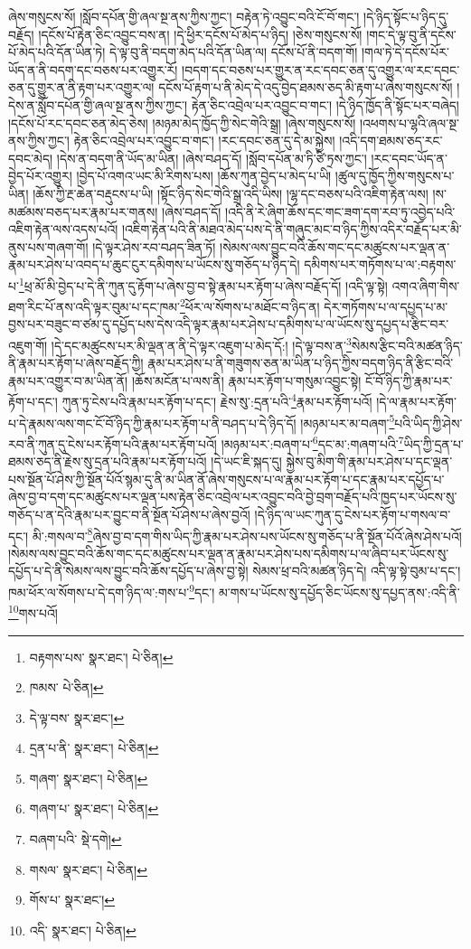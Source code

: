 ཞེས་གསུངས་སོ། །སློབ་དཔོན་གྱི་ཞལ་སྔ་ནས་ཀྱིས་ཀྱང་། བརྟེན་ཏེ་འབྱུང་བའི་ངོ་བོ་གང་། །དེ་ཉིད་སྟོང་པ་ཉིད་དུ་བརྗོད། །དངོས་པོ་རྟེན་ཅིང་འབྱུང་བས་ན། །དེ་ཕྱིར་དངོས་པོ་མེད་པ་ཉིད། །ཅེས་གསུངས་སོ། །གང་དེ་ལྟ་བུ་ནི་དངོས་པོ་མེད་པའི་དོན་ཡིན་ཏེ། དེ་ལྟ་བུ་ནི་བདག་མེད་པའི་དོན་ཡིན་ལ། དངོས་པོ་ནི་བདག་གོ། །གལ་ཏེ་དེ་དངོས་པོར་ཡོད་ན་ནི་བདག་དང་བཅས་པར་འགྱུར་རོ། །བདག་དང་བཅས་པར་གྱུར་ན་རང་དབང་ཅན་དུ་འགྱུར་ལ་རང་དབང་ཅན་དུ་གྱུར་ན་ནི་རྟག་པར་འགྱུར་ལ། དངོས་པོ་རྟག་པ་ནི་མེད་དེ་འདུ་བྱེད་ཐམས་ཅད་མི་རྟག་པ་ཞེས་གསུངས་སོ། །དེས་ན་སློབ་དཔོན་གྱི་ཞལ་སྔ་ནས་ཀྱིས་ཀྱང་། རྟེན་ཅིང་འབྲེལ་པར་འབྱུང་བ་གང་། །དེ་ཉིད་ཁྱོད་ནི་སྟོང་པར་བཞེད། །དངོས་པོ་རང་དབང་ཅན་མེད་ཅེས། །མཉམ་མེད་ཁྱོད་ཀྱི་སེང་གེའི་སྒྲ། །ཞེས་གསུངས་སོ། །འཕགས་པ་ལྷའི་ཞལ་སྔ་ནས་ཀྱིས་ཀྱང་། རྟེན་ཅིང་འབྲེལ་པར་འབྱུང་བ་གང་། །རང་དབང་ཅན་དུ་དེ་མ་སྐྱེས། །འདི་དག་ཐམས་ཅད་རང་དབང་མེད། །དེས་ན་བདག་ནི་ཡོད་མ་ཡིན། །ཞེས་བཤད་དོ། །སློབ་དཔོན་མ་ཏི་ཙི་ཏྲས་ཀྱང་། །རང་དབང་ཡོད་ན་བྱེད་པོར་འགྱུར། །བྱེད་པོ་འགའ་ཡང་མི་རིགས་པས། །ཆོས་ཀུན་བྱེད་པ་མེད་པ་ཡི། །ཚུལ་དུ་ཁྱོད་ཀྱིས་གསུངས་པ་ཡིན། །ཆོས་ཀྱི་རྔ་ཆེན་བརྡུངས་པ་ཡི། །སྟོང་ཉིད་སེང་གེའི་སྒྲ་འདི་ཡིས། །ལྷ་དང་བཅས་པའི་འཇིག་རྟེན་ལས། །ས་མཚམས་བཅད་པར་རྣམ་པར་གནས། །ཞེས་བཤད་དོ། །འདི་ནི་རེ་ཞིག་ཆོས་དང་གང་ཟག་དག་རབ་ཏུ་འབྱེད་པའི་འཇིག་རྟེན་ལས་འདས་པའོ། །འཇིག་རྟེན་པའི་ནི་མཐའ་མེད་པས་དེ་ནི་གཞུང་མང་བ་ཉིད་ཀྱིས་འདིར་བརྗོད་པར་མི་ནུས་པས་གཞག་གོ། །དེ་ལྟར་ཤེས་རབ་བཤད་ཟིན་ཏོ། །སེམས་ལས་བྱུང་བའི་ཆོས་གང་དང་མཚུངས་པར་ལྡན་ན་རྣམ་པར་ཤེས་པ་འབད་པ་ཆུང་ངུར་དམིགས་པ་ཡོངས་སུ་གཅོད་པ་ཉིད་དེ། དམིགས་པར་གཏོགས་པ་ལ་:བརྟགས་པ་\footnote{བརྟགས་པས་  སྣར་ཐང་།  པེ་ཅིན། }ཕྲ་མོ་མི་བྱེད་པ་དེ་ནི་ཀུན་དུ་རྟོག་པ་ཞེས་བྱ་བ་སྟེ་རྣམ་པར་རྟོག་པ་ཞེས་བརྗོད་དོ། །འདི་ལྟ་སྟེ། འགའ་ཞིག་གིས་ཐག་རིང་པོ་ནས་འདི་ལྟར་བུམ་པ་དང་ཁམ་\footnote{ཁམས་  པེ་ཅིན། }ཕོར་ལ་སོགས་པ་མཐོང་བ་ཉིད་ན། དེར་གཏོགས་པ་ལ་དཔྱད་པ་མ་བྱས་པར་བཟུང་བ་ཙམ་དུ་དཔྱོད་པས་དེས་འདི་ལྟར་རྣམ་པར་ཤེས་པ་དམིགས་པ་ལ་ཡོངས་སུ་དཔྱད་པ་རྩིང་བར་འཇུག་གོ། །དེ་དང་མཚུངས་པར་མི་ལྡན་ན་ནི་དེ་ལྟར་འཇུག་པ་མེད་དོ:། །དེ་ལྟ་བས་ན་\footnote{དེ་ལྟ་བས་  སྣར་ཐང་། }སེམས་རྩིང་བའི་མཚན་ཉིད་ནི་རྣམ་པར་རྟོག་པ་ཞེས་བརྗོད་ཀྱི། རྣམ་པར་ཤེས་པ་ནི་གཟུགས་ཅན་མ་ཡིན་པ་ཉིད་ཀྱིས་བདག་ཉིད་ནི་རྩིང་བའི་རྣམ་པར་འགྱུར་བ་མ་ཡིན་ནོ། །ཆོས་མངོན་པ་ལས་ནི། རྣམ་པར་རྟོག་པ་གསུམ་འབྱུང་སྟེ། ངོ་བོ་ཉིད་ཀྱི་རྣམ་པར་རྟོག་པ་དང་། ཀུན་ཏུ་ངེས་པའི་རྣམ་པར་རྟོག་པ་དང་། རྗེས་སུ་:དྲན་པའི་\footnote{དྲན་པ་ནི་  སྣར་ཐང་།  པེ་ཅིན། }རྣམ་པར་རྟོག་པའོ། །དེ་ལ་རྣམ་པར་རྟོག་པ་དེ་རྣམས་ལས་གང་ངོ་བོ་ཉིད་ཀྱི་རྣམ་པར་རྟོག་པ་ནི་བཤད་པ་དེ་ཉིད་དོ། །མཉམ་པར་མ་བཞག་\footnote{གཞག་  སྣར་ཐང་།  པེ་ཅིན། }པའི་ཡིད་ཀྱི་ཤེས་རབ་ནི་ཀུན་དུ་ངེས་པར་རྟོག་པའི་རྣམ་པར་རྟོག་པའོ། །མཉམ་པར་:བཞག་པ་\footnote{གཞག་པ་  སྣར་ཐང་།  པེ་ཅིན། }དང་མ་:གཞག་པའི་\footnote{བཞག་པའི་  སྡེ་དགེ། }ཡིད་ཀྱི་དྲན་པ་ཐམས་ཅད་ནི་རྗེས་སུ་དྲན་པའི་རྣམ་པར་རྟོག་པའོ། །དེ་ཡང་ཇི་སྐད་དུ། སྐྱེས་བུ་མིག་གི་རྣམ་པར་ཤེས་པ་དང་ལྡན་པས་སྔོན་པོ་ཤེས་ཀྱི་སྔོན་པོའོ་སྙམ་དུ་ནི་མ་ཡིན་ནོ་ཞེས་གསུངས་པ་ལ་རྣམ་པར་རྟོག་པ་དང་རྣམ་པར་དཔྱོད་པ་ཞེས་བྱ་བ་དག་དང་མཚུངས་པར་ལྡན་པས་རྟེན་ཅིང་འབྲེལ་པར་འབྱུང་བའི་བྱེ་བྲག་བརྗོད་པའི་ཁྱད་པར་ཡོངས་སུ་གཅོད་པ་ན་དེའི་རྣམ་པར་བྱུང་བ་ནི་སྔོན་པོ་ཤེས་པ་ཞེས་བྱའོ། །དེ་ཉིད་ལ་ཡང་ཀུན་དུ་ངེས་པར་རྟོག་པ་གསལ་བ་དང་། མི་:གསལ་བ་\footnote{གསལ་  སྣར་ཐང་།  པེ་ཅིན། }ཞེས་བྱ་བ་དག་གིས་ཡིད་ཀྱི་རྣམ་པར་ཤེས་པས་ཡོངས་སུ་གཅོད་པ་ནི་སྔོན་པོའོ་ཞེས་ཤེས་པའོ། །སེམས་ལས་བྱུང་བའི་ཆོས་གང་དང་མཚུངས་པར་ལྡན་ན་རྣམ་པར་ཤེས་པས་དམིགས་པ་ལ་ཞིབ་པར་ཡོངས་སུ་དཔྱོད་པ་དེ་ནི་སེམས་ལས་བྱུང་བའི་ཆོས་དཔྱོད་པ་ཞེས་བྱ་སྟེ། སེམས་ཕྲ་བའི་མཚན་ཉིད་དེ། འདི་ལྟ་སྟེ་བུམ་པ་དང་། ཁམ་ཕོར་ལ་སོགས་པ་དེ་དག་ཉིད་ལ་:གས་པ་\footnote{གོས་པ་  སྣར་ཐང་། }དང་། མ་གས་པ་ཡོངས་སུ་དཔྱོད་ཅིང་ཡོངས་སུ་དཔྱད་ནས་:འདི་ནི་\footnote{འདི་  སྣར་ཐང་།  པེ་ཅིན། }གས་པའོ། 